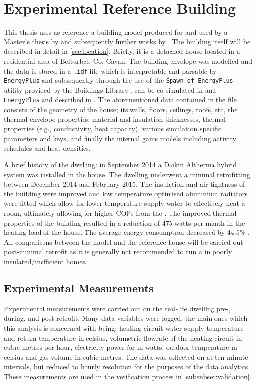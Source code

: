 \section{Experimental Reference Building}\label{sec:methodrefbuild}
This thesis uses as reference a building model produced for and used by a Master's thesis by \citeauthor{keogh_technical_2018} \cite{keogh_technical_2018} and subsequently further works by \citeauthor{keogh_technical_2022}. The building itself will be described in detail in \cref{sec:location}. Briefly, it is a detached house located in a residential area of Belturbet, Co. Cavan. The building envelope was modelled and the data is stored in a \texttt{.idf}-file which is interpretable and parsable by \texttt{EnergyPlus} and subsequently through the use of the \texttt{Spawn of EnergyPlus} utility provided by the Buildings Library \cite{wetter_modelica_2014}, can be co-simulated in \modelica and \texttt{EnergyPlus} and described in \cite{wetter2021software}. The aforementioned data contained in the file consists of the geometry of the house; its walls, floors, ceilings, roofs, etc, the thermal envelope properties; material and insulation thicknesses, thermal properties (e.g., conductivity, heat capacity), various simulation specific parameters and keys, and finally the internal gains models including activity schedules and heat densities.  

A brief history of the dwelling: in September 2014 a Daikin Altherma hybrid \HP system was installed in the house. The dwelling underwent a minimal retrofitting between December 2014 and February 2015. The insulation and air tightness of the building were improved and low temperature optimised aluminium radiators were fitted which allow for lower temperature supply water to effectively heat a room, ultimately allowing for higher \acp{COP} from the \HP. The improved thermal properties of the building resulted in a reduction of 475 watts per month in the heating load of the house. The average energy consumption decreased by 44.5\% \cite{keogh_technical_2018}. All comparisons between the model and the reference house will be carried out post-minimal retrofit as it is generally not recommended to run a \HP in poorly insulated/inefficient homes.

\subsection{Experimental Measurements} \label{subsec:expmeasure}
Experimental measurements were carried out on the real-life dwelling pre-, during, and post-retrofit. Many data variables were logged, the main ones which this analysis is concerned with being: heating circuit water supply temperature and return temperature in celsius, volumetric flowrate of the heating circuit in cubic metres per hour, electricity power for \HP in watts, outdoor temperature in celsius and gas volume in cubic metres. The data was collected on at ten-minute intervals, but reduced to hourly resolution for the purposes of the data analytics. These measurements are used in the verification process in \cref{subsubsec:validation}.


